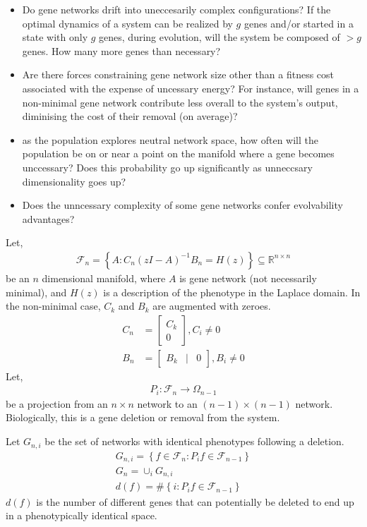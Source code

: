 \documentclass[11 pt]{article}
\newcommand{\1}{\mathbbm{1}}
\begin{document}
  \begin{itemize}
    \item Do gene networks drift into uneccesarily complex configurations? If the optimal dynamics of a system can be realized by $g$ genes and/or started in a state with only $g$ genes, during evolution, will the system be composed of $> g$ genes. How many more genes than necessary? 
    \item Are there forces constraining gene network size other than a fitness cost associated with the expense of uncessary energy? For instance, will genes in a non-minimal gene network contribute less overall to the system's output, diminising the cost of their removal (on average)? 
    \item as the population explores neutral network space, how often will the population be on or near a point on the manifold where a gene becomes unccessary? Does this probability go up significantly as unneccsary dimensionality goes up?
    \item Does the unncessary complexity of some gene networks confer evolvability advantages? 
  \end{itemize}
Let, 
  \begin{align*}
    \mathcal{F}_{n} = \left\{ A : C_{n}(zI-A)^{-1} B_{n} = H(z) \right\} \subseteq \mathbb{R}^{n \times n}
  \end{align*}
  be an $n$ dimensional manifold, where $A$ is gene network (not necessarily minimal), and $H(z)$ is a description of the phenotype in the Laplace domain. In the non-minimal case, $C_{k}$ and $B_{k}$ are augmented with zeroes.
  \begin{align*}
    C_{n} &= \left[ \begin{array}{cc} C_{k}  \\ \hline 0 \end{array} \right], C_{i} \neq 0 \\
      B_{n} &= \left[ \begin{array}{ccc} B_{k} & \vert & 0 \end{array} \right], B_{i} \neq 0
  \end{align*}
Let, 
  \begin{align*}
        P_{i} : \mathcal{F}_{n} \rightarrow \Omega_{n-1}
  \end{align*}
  be a projection from an $n \times n$ network to an $(n-1) \times (n-1)$ network. Biologically, this is a gene deletion or removal from the system.

  Let $G_{n,i}$ be the set of networks with identical phenotypes following a deletion. 
  \begin{align*}
        G_{n,i} = \left\{ f \in \mathcal{F}_{n} : P_{i}f \in \mathcal{F}_{n-1} \right\} \\
        G_{n} = \cup_{i} G_{n,i} \\
        d(f) = \# \left\{ i : P_{i}f \in \mathcal{F}_{n-1} \right\} 
  \end{align*}
$d(f)$ is the number of different genes that can potentially be deleted to end up in a phenotypically identical space. 
\end{document}
